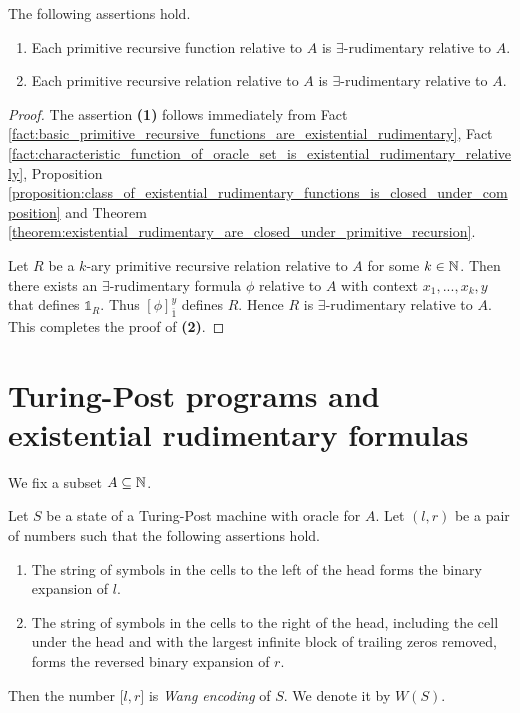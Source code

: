 \documentclass[10pt]{amsart}
\begin{document}
\begin{corollary}\label{corollary:primitive_recursive_functions_and_relations_are_existential_rudimentary}
	The following assertions hold.
	\begin{enumerate}[label=\emph{\textbf{(\arabic*)}}, leftmargin=3.0em]
		\item Each primitive recursive function relative to $A$ is $\exists$-rudimentary relative to $A$.
		\item Each primitive recursive relation relative to $A$ is $\exists$-rudimentary relative to $A$.
	\end{enumerate}
\end{corollary}
\begin{proof}
	The assertion \textbf{(1)} follows immediately from Fact \ref{fact:basic_primitive_recursive_functions_are_existential_rudimentary}, Fact \ref{fact:characteristic_function_of_oracle_set_is_existential_rudimentary_relatively}, Proposition \ref{proposition:class_of_existential_rudimentary_functions_is_closed_under_composition} and Theorem \ref{theorem:existential_rudimentary_are_closed_under_primitive_recursion}.

	Let $R$ be a $k$-ary primitive recursive relation relative to $A$ for some $k \in {\mathbb N}$. Then there exists an $\exists$-rudimentary formula $\phi$ relative to $A$ with context $x_1,...,x_{k},y$ that defines $\mathbb{1}_R$. Thus $[\phi]^{y}_{\overline{1}}$ defines $R$. Hence $R$ is $\exists$-rudimentary relative to $A$. This completes the proof of \textbf{(2)}.
\end{proof}

\section{Turing-Post programs and existential rudimentary formulas}
\noindent
We fix a subset $A \subseteq {\mathbb N}$.

\begin{definition}
	Let $S$ be a state of a Turing-Post machine with oracle for $A$. Let $(l,r)$ be a pair of numbers such that the following assertions hold.
	\begin{enumerate}[label=\textbf{(\arabic*)}, leftmargin=3.0em]
		\item The string of symbols in the cells to the left of the head forms the binary expansion of $l$.
		\item The string of symbols in the cells to the right of the head, including the cell under the head and with the largest infinite block of trailing zeros removed, forms the reversed binary expansion of $r$.
	\end{enumerate}
	Then the number $\pmb{[}l,r\pmb{]}$ is \textit{Wang encoding} of $S$. We denote it by $W(S)$.
\end{definition}
\end{document}
